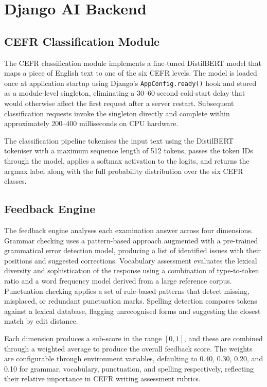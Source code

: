 \documentclass[12pt, a4paper]{report}
\begin{document}
\section{Django AI Backend}

\subsection{CEFR Classification Module}

The CEFR classification module implements a fine-tuned DistilBERT model that maps a piece of English text to one of the six CEFR levels. The model is loaded once at application startup using Django's \texttt{AppConfig.ready()} hook and stored as a module-level singleton, eliminating a 30--60 second cold-start delay that would otherwise affect the first request after a server restart. Subsequent classification requests invoke the singleton directly and complete within approximately 200--400 milliseconds on CPU hardware.

The classification pipeline tokenises the input text using the DistilBERT tokeniser with a maximum sequence length of 512 tokens, passes the token IDs through the model, applies a softmax activation to the logits, and returns the argmax label along with the full probability distribution over the six CEFR classes.

\subsection{Feedback Engine}

The feedback engine analyses each examination answer across four dimensions. Grammar checking uses a pattern-based approach augmented with a pre-trained grammatical error detection model, producing a list of identified issues with their positions and suggested corrections. Vocabulary assessment evaluates the lexical diversity and sophistication of the response using a combination of type-to-token ratio and a word frequency model derived from a large reference corpus. Punctuation checking applies a set of rule-based patterns that detect missing, misplaced, or redundant punctuation marks. Spelling detection compares tokens against a lexical database, flagging unrecognised forms and suggesting the closest match by edit distance.

Each dimension produces a sub-score in the range $[0, 1]$, and these are combined through a weighted average to produce the overall feedback score. The weights are configurable through environment variables, defaulting to 0.40, 0.30, 0.20, and 0.10 for grammar, vocabulary, punctuation, and spelling respectively, reflecting their relative importance in CEFR writing assessment rubrics.
\end{document}
